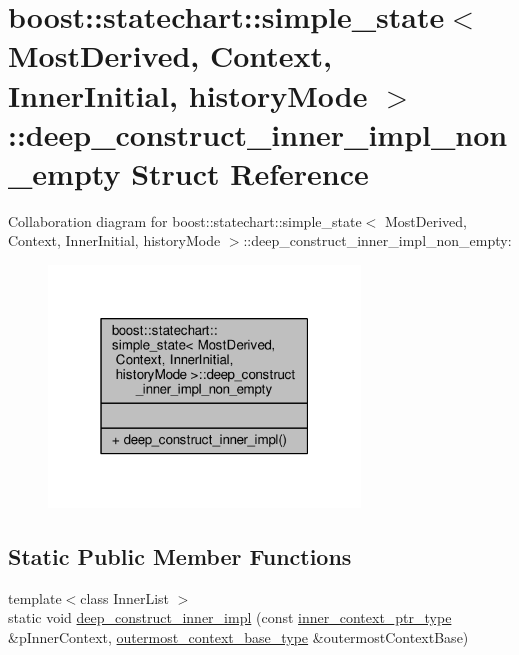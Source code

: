 \hypertarget{structboost_1_1statechart_1_1simple__state_1_1deep__construct__inner__impl__non__empty}{}\section{boost\+:\+:statechart\+:\+:simple\+\_\+state$<$ Most\+Derived, Context, Inner\+Initial, history\+Mode $>$\+:\+:deep\+\_\+construct\+\_\+inner\+\_\+impl\+\_\+non\+\_\+empty Struct Reference}
\label{structboost_1_1statechart_1_1simple__state_1_1deep__construct__inner__impl__non__empty}


Collaboration diagram for boost\+:\+:statechart\+:\+:simple\+\_\+state$<$ Most\+Derived, Context, Inner\+Initial, history\+Mode $>$\+:\+:deep\+\_\+construct\+\_\+inner\+\_\+impl\+\_\+non\+\_\+empty\+:
\nopagebreak
\begin{figure}[H]
\begin{center}
\leavevmode
\includegraphics[width=235pt]{structboost_1_1statechart_1_1simple__state_1_1deep__construct__inner__impl__non__empty__coll__graph}
\end{center}
\end{figure}
\subsection*{Static Public Member Functions}
\begin{DoxyCompactItemize}
\item 
{\footnotesize template$<$class Inner\+List $>$ }\\static void \mbox{\hyperlink{structboost_1_1statechart_1_1simple__state_1_1deep__construct__inner__impl__non__empty_a5e9e6ad9f24ac1eea0c3b2dc8d12cad0}{deep\+\_\+construct\+\_\+inner\+\_\+impl}} (const \mbox{\hyperlink{classboost_1_1statechart_1_1simple__state_ad6d3233a11a23e91b4cc9edcae799379}{inner\+\_\+context\+\_\+ptr\+\_\+type}} \&p\+Inner\+Context, \mbox{\hyperlink{classboost_1_1statechart_1_1simple__state_a50f21d7a7d6632eb34430e74cbad3197}{outermost\+\_\+context\+\_\+base\+\_\+type}} \&outermost\+Context\+Base)
\end{DoxyCompactItemize}


